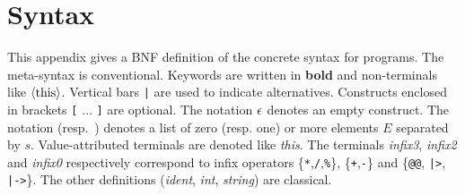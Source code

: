 
\chapter{Syntax}
\label{chap:syntax}

This appendix gives a BNF definition of the concrete syntax for \hocl programs.  The meta-syntax is
conventional. Keywords are written in \textbf{bold} and non-terminals like $\langle\textnormal{this}\rangle$.
Vertical bars {\tt |} are used to indicate alternatives.  Constructs enclosed in brackets {\tt [}
$\ldots$ {\tt ]} are optional. The notation $\epsilon$ denotes an empty construct. The notation
 (resp.~) denotes a list of zero (resp. one) or more elements
$E$ separated by $s$. Value-attributed terminals are denoted like \textit{this}. The terminals
\textit{infix3}, \textit{infix2} and \textit{infix0} respectively correspond to infix operators
\{\verb|*|,\verb|/|,\verb|%|\}, \{\verb|+|,\verb|-|\} and
\{\verb|@@|, \verb'|>', \verb'|->'\}. The other definitions (\textit{ident}, \textit{int},
\textit{string}) are classical.



